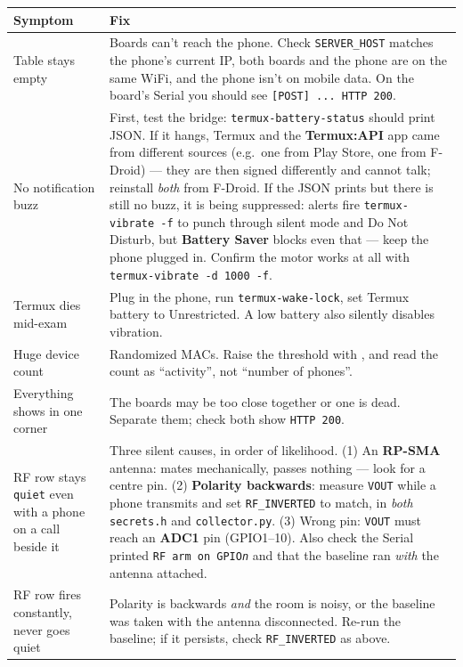 \documentclass[11pt]{article}
\newcommand{\key}[1]{\fbox{\ttfamily #1}}
\begin{document}
\begin{center}
\begin{tabular}{@{}p{5.3cm}p{9cm}@{}}
\toprule
\textbf{Symptom} & \textbf{Fix}\\
\midrule
Table stays empty & Boards can't reach the phone. Check
\texttt{SERVER\_HOST} matches the phone's current IP, both boards and the phone
are on the same WiFi, and the phone isn't on mobile data. On the board's Serial
you should see \texttt{[POST] ... HTTP 200}.\\
No notification buzz & First, test the bridge: \texttt{termux-battery-status}
should print JSON. If it hangs, Termux and the \textbf{Termux:API} app came from
different sources (e.g.\ one from Play Store, one from F-Droid) --- they are then
signed differently and cannot talk; reinstall \emph{both} from F-Droid. If the
JSON prints but there is still no buzz, it is being suppressed: alerts fire
\texttt{termux-vibrate -f} to punch through silent mode and Do Not Disturb, but
\textbf{Battery Saver} blocks even that --- keep the phone plugged in. Confirm the
motor works at all with \texttt{termux-vibrate -d 1000 -f}.\\
Termux dies mid-exam & Plug in the phone, run \texttt{termux-wake-lock}, set
Termux battery to Unrestricted. A low battery also silently disables vibration.\\
Huge device count & Randomized MACs. Raise the threshold with \key{+}, and read
the count as ``activity'', not ``number of phones''.\\
Everything shows in one corner & The boards may be too close together or one is
dead. Separate them; check both show \texttt{HTTP 200}.\\
RF row stays \texttt{quiet} even with a phone on a call beside it & Three silent
causes, in order of likelihood. (1) An \textbf{RP-SMA} antenna: mates
mechanically, passes nothing --- look for a centre pin. (2) \textbf{Polarity
backwards}: measure \texttt{VOUT} while a phone transmits and set
\texttt{RF\_INVERTED} to match, in \emph{both} \texttt{secrets.h} and
\texttt{collector.py}. (3) Wrong pin: \texttt{VOUT} must reach an \textbf{ADC1}
pin (GPIO1--10). Also check the Serial printed \texttt{RF arm on GPIO\emph{n}} and
that the baseline ran \emph{with} the antenna attached.\\
RF row fires constantly, never goes quiet & Polarity is backwards \emph{and} the
room is noisy, or the baseline was taken with the antenna disconnected. Re-run the
baseline; if it persists, check \texttt{RF\_INVERTED} as above.\\

\end{tabular}
\end{center}
\end{document}
